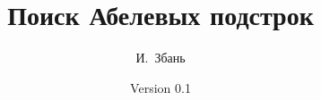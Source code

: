 \documentclass[11pt,a4paper]{article}
\theoremstyle{plain}
\theoremstyle{definition}
\theoremstyle{remark}
\begin{document}
\pagestyle{myheadings}

\makeatletter
\renewcommand{\@oddhead}{\hfil Поиск абелевых подстрок\ \hfil\thepage}
\makeatother

\title{Поиск Абелевых подстрок}
\author{И.~Збань}
\date{Version 0.1}

\maketitle

\tableofcontents







\clearpage

\end{document}
